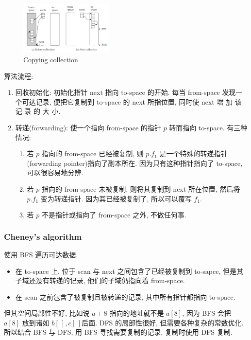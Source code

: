 \begin{figure}[!htb]
    \centering
    \includegraphics[width=0.42\textwidth]{pic/CP13/Copying collection}
    \caption{Copying collection}
\end{figure}

算法流程:
\begin{enumerate}
    \item 回收初始化: 初始化指针 next 指向 to-space 的开始. 每当 from-space 发现一个可达记录, 便把它复制到 to-space 的 next 所指位置, 同时使 next 增 加 该 记 录 的 大 小. 
    \item 转递(forwarding): 使一个指向 from-space 的指针 $p$ 转而指向 to-space. 有三种情况:
    \begin{enumerate}
        \item 若 $p$ 指向的 from-space 已经被复制, 则 $p.f_1$ 是一个特殊的转递指针(forwarding pointer)指向了副本所在. 因为只有这种指针指向了 to-space, 可以很容易地分辨. 
        \item 若 $p$ 指向的 from-space 未被复制, 则将其复制到 next 所在位置, 然后将 $p.f_1$ 变为转递指针. 因为其已经被复制了, 所以可以覆写 $f_1$.
        \item 若 $p$ 不是指针或指向了 from-space 之外, 不做任何事. 
    \end{enumerate}
\end{enumerate}

\subsubsection{Cheney's algorithm}
使用 BFS 遍历可达数据. 

\begin{itemize}
    \item 在 to-space 上, 位于 scan 与 next 之间包含了已经被复制到 to-sapce, 但是其子域还没有转递的记录, 他们的子域仍指向着 from-space. 
    \item 在 scan 之前包含了被复制且被转递的记录, 其中所有指针都指向 to-space.
\end{itemize}

但其空间局部性不好, 比如说 $a+8$ 指向的地址就不是 $a[8]$, 因为 BFS 会把 $a[8]$ 放到诸如 $b[\ ],c[\ ]$后面.  DFS 的局部性很好, 但需要各种复杂的常数优化. 所以结合 BFS 与 DFS, 用 BFS 寻找需要复制的记录, 复制时使用 DFS 复制. 

